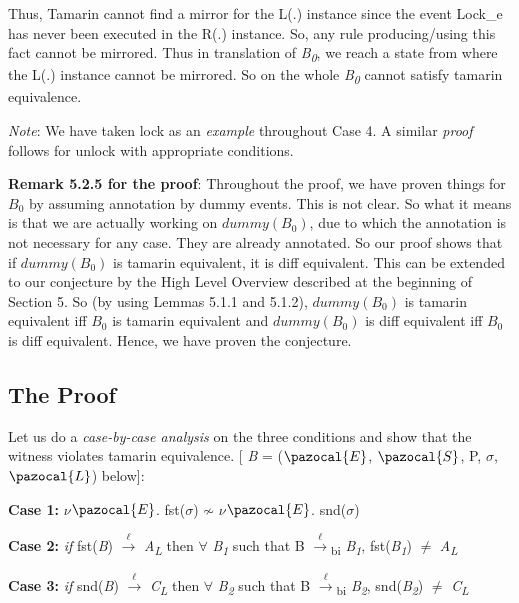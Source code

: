 \documentclass[11pt]{article}
\newcommand{\Sa}{\pazocal{S}}
\newcommand{\Lb}{\pazocal{L}}
\newcommand{\Ea}{\pazocal{E}}
\begin{document}
Thus, Tamarin cannot find a mirror for the L(.) instance since the event Lock\_e has never been executed in the R(.) instance. So, any rule producing/using this fact cannot be mirrored. Thus in translation of {\it B\textsubscript{0}}, we reach a state from where the L(.) instance cannot be mirrored. So on the whole {\it B\textsubscript{0}} cannot satisfy tamarin equivalence.\newline

{\it Note}: We have taken lock as an {\it example} throughout Case 4. A similar {\it proof} follows for unlock with appropriate conditions.\newline

{\bf Remark 5.2.5 for the proof}: Throughout the proof, we have proven things for $B_0$ by assuming annotation by dummy events. This is not clear. So what it means is that we are actually working on $dummy(B_0)$, due to which the annotation is not necessary for any case. They are already annotated. So our proof shows that if $dummy(B_0)$ is tamarin equivalent, it is diff equivalent. This can be extended to our conjecture by the High Level Overview described at the beginning of Section 5. So (by using Lemmas 5.1.1 and 5.1.2), $dummy(B_0)$ is tamarin equivalent iff $B_0$ is tamarin equivalent and $dummy(B_0)$ is diff equivalent iff $B_0$ is diff equivalent. Hence, we have proven the conjecture.

\subsection{The Proof}
Let us do a {\it case-by-case analysis} on the three conditions and show that the witness violates tamarin equivalence. [ {\it B} = ($\Ea$, $\Sa$, P, $\sigma$, $\Lb$) below]: \newline

{\bf Case 1: }$\nu$$\Ea$. fst($\sigma$) $\not\sim$ $\nu$$\Ea$. snd($\sigma$)\newline

{\bf Case 2: }{\it if} fst({\it B}) {$\xrightarrow[\text{}]{\text{$\ell$}}$} {\it A}\textsubscript{{\it L}} then {$\forall$} {\it B\textsubscript{1}} such that 
  B {$\xrightarrow[\text{}]{\text{$\ell$}}$}{\textsubscript{bi}} {\it B\textsubscript{1}}, fst({\it B\textsubscript{1}}) $\neq$ {\it A}\textsubscript{{\it L}}\newline

{\bf Case 3: }{\it if} snd({\it B}) {$\xrightarrow[\text{}]{\text{$\ell$}}$} {\it C}\textsubscript{{\it L}} then {$\forall$} {\it B\textsubscript{2}} such that 
  B {$\xrightarrow[\text{}]{\text{$\ell$}}$}{\textsubscript{bi}} {\it B\textsubscript{2}}, snd({\it B\textsubscript{2}}) $\neq$ {\it C}\textsubscript{{\it L}}\newline
\end{document}
